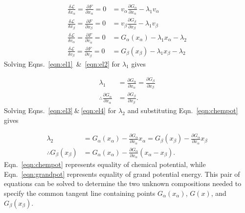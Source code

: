 \documentclass[10pt]{article}
\begin{document}
\begin{align}
  \label{eqn:el1}
  \frac{\delta\mathcal{L}}{\delta x_{\alpha}} = \frac{\partial F}{\partial x_{\alpha}} = 0
  &= v_{\alpha} \frac{\partial G_{\alpha}}{\partial x_{\alpha}} - \lambda_1 v_{\alpha}\\
  \label{eqn:el2}
  \frac{\delta\mathcal{L}}{\delta x_{\beta}} = \frac{\partial F}{\partial x_{\beta}} = 0
  &= v_{\beta} \frac{\partial G_{\beta}}{\partial x_{\beta}} - \lambda_1 v_{\beta}\\
  \label{eqn:el3}
  \frac{\delta\mathcal{L}}{\delta v_{\alpha}} = \frac{\partial F}{\partial v_{\alpha}} = 0
  &= G_{\alpha}(x_{\alpha}) - \lambda_1x_{\alpha} - \lambda_2\\
  \label{eqn:el4}
  \frac{\delta\mathcal{L}}{\delta v_{\beta}} = \frac{\partial F}{\partial v_{\beta}} = 0
  &= G_{\beta}(x_{\beta}) - \lambda_1x_{\beta} - \lambda_2
\end{align}
Solving Eqns.~\ref{eqn:el1}~\&~\ref{eqn:el2} for $\lambda_1$ gives

\begin{align}
  \lambda_1 &= \frac{\partial G_{\alpha}}{\partial x_{\alpha}}
             = \frac{\partial G_{\beta}}{\partial x_{\beta}}\\
  \label{eqn:chempot}
  \therefore \frac{\partial G_{\alpha}}{\partial x_{\alpha}} &=
             \frac{\partial G_{\beta}}{\partial x_{\beta}}.
\end{align}
Solving Eqns.~\ref{eqn:el3}$~\&~$\ref{eqn:el4} for $\lambda_2$ and substituting
Eqn.~\ref{eqn:chempot} gives

\begin{align}
  \lambda_2 &= G_{\alpha}(x_{\alpha})
             - \frac{\partial G_{\alpha}}{\partial x_{\alpha}} x_{\alpha}
             = G_{\beta}(x_{\beta})
             - \frac{\partial G_{\alpha}}{\partial x_{\alpha}} x_{\beta}\\
  \label{eqn:grandpot}
  \therefore G_{\beta}(x_{\beta}) &= G_{\alpha}(x_{\alpha})
                                   - \frac{\partial G_{\alpha}}{\partial x_{\alpha}}
                                     \left(x_{\alpha} - x_{\beta}\right).
\end{align}
Eqn.~\ref{eqn:chempot} represents equality of chemical potential, while
Eqn.~\ref{eqn:grandpot} represents equality of grand potential energy. This pair
of equations can be solved to determine the two unknown compositions needed to
specify the common tangent line containing points $G_{\alpha}(x_{\alpha})$,
$G(x)$, and $G_{\beta}(x_{\beta})$.
\end{document}
